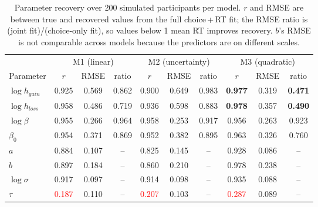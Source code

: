 \documentclass[11pt,a4paper]{article}
\begin{document}
\begin{table}[H]\centering
\caption{Parameter recovery over 200 simulated participants per model. $r$ and RMSE are between
true and recovered values from the full choice\,+\,RT fit; the RMSE ratio is (joint
fit)/(choice-only fit), so values below 1 mean RT improves recovery. $b$'s RMSE is not
comparable across models because the predictors are on different scales.}
\label{tab:recovery}
\small
\begin{tabular}{lccccccccc}
\toprule
& \multicolumn{3}{c}{M1 (linear)} & \multicolumn{3}{c}{M2 (uncertainty)} & \multicolumn{3}{c}{M3 (quadratic)}\\
\cmidrule(lr){2-4}\cmidrule(lr){5-7}\cmidrule(lr){8-10}
Parameter & $r$ & RMSE & ratio & $r$ & RMSE & ratio & $r$ & RMSE & ratio\\
\midrule
$\log h_{gain}$ & 0.925 & 0.569 & 0.862 & 0.900 & 0.649 & 0.983 & \textbf{0.977} & 0.319 & \textbf{0.471}\\
$\log h_{loss}$ & 0.958 & 0.486 & 0.719 & 0.936 & 0.598 & 0.883 & \textbf{0.978} & 0.357 & \textbf{0.490}\\
$\log\beta$     & 0.955 & 0.266 & 0.964 & 0.958 & 0.253 & 0.917 & 0.956 & 0.263 & 0.923\\
$\beta_0$       & 0.954 & 0.371 & 0.869 & 0.952 & 0.382 & 0.895 & 0.963 & 0.326 & 0.760\\
$a$             & 0.884 & 0.107 & --    & 0.825 & 0.145 & --    & 0.928 & 0.086 & --\\
$b$             & 0.897 & 0.184 & --    & 0.860 & 0.210 & --    & 0.978 & 0.238 & --\\
$\log\sigma$    & 0.917 & 0.097 & --    & 0.914 & 0.098 & --    & 0.935 & 0.088 & --\\
$\tau$          & \textcolor{red}{0.187} & 0.110 & -- & \textcolor{red}{0.207} & 0.103 & -- & \textcolor{red}{0.287} & 0.089 & --\\
\bottomrule
\end{tabular}
\end{table}
\end{document}
